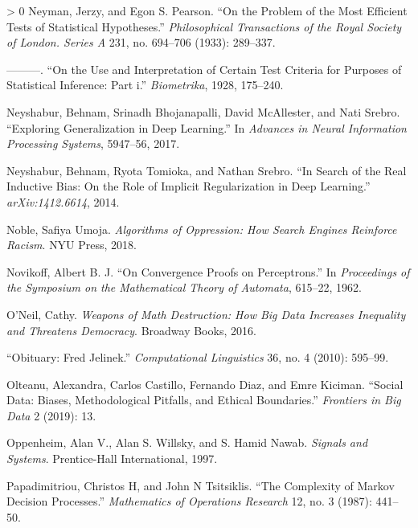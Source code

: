 \documentclass{tufte-book}
\newlength{\cslhangindent}
\newenvironment{CSLReferences}[3] %
 {%
  \setlength{\parindent}{0pt}
  \ifodd #1 \everypar{\setlength{\hangindent}{\cslhangindent}}\ignorespaces\fi
  \ifnum #2 > 0
  \setlength{\parskip}{#3\baselineskip}
  \fi
 }%
 {
 }
\begin{document}
\begin{CSLReferences}{1}{0}
\leavevmode\hypertarget{ref-neyman1933}{}%
Neyman, Jerzy, and Egon S. Pearson. {``On the Problem of the Most
Efficient Tests of Statistical Hypotheses.''} \emph{Philosophical
Transactions of the Royal Society of London. Series A} 231, no. 694--706
(1933): 289--337.

\leavevmode\hypertarget{ref-neyman1928use}{}%
---------. {``On the Use and Interpretation of Certain Test Criteria for
Purposes of Statistical Inference: Part i.''} \emph{Biometrika}, 1928,
175--240.

\leavevmode\hypertarget{ref-neyshabur2017exploring}{}%
Neyshabur, Behnam, Srinadh Bhojanapalli, David McAllester, and Nati
Srebro. {``Exploring Generalization in Deep Learning.''} In
\emph{Advances in Neural Information Processing Systems}, 5947--56,
2017.

\leavevmode\hypertarget{ref-neyshabur2014search}{}%
Neyshabur, Behnam, Ryota Tomioka, and Nathan Srebro. {``In Search of the
Real Inductive Bias: On the Role of Implicit Regularization in Deep
Learning.''} \emph{arXiv:1412.6614}, 2014.

\leavevmode\hypertarget{ref-noble2018algorithms}{}%
Noble, Safiya Umoja. \emph{Algorithms of Oppression: How Search Engines
Reinforce Racism}. {NYU} Press, 2018.

\leavevmode\hypertarget{ref-Novikoff1962}{}%
Novikoff, Albert B. J. {``On Convergence Proofs on Perceptrons.''} In
\emph{Proceedings of the Symposium on the Mathematical Theory of
Automata}, 615--22, 1962.

\leavevmode\hypertarget{ref-oneil2016weapons}{}%
O'Neil, Cathy. \emph{Weapons of Math Destruction: How Big Data Increases
Inequality and Threatens Democracy}. Broadway Books, 2016.

\leavevmode\hypertarget{ref-JelinekObit}{}%
{``Obituary: {F}red {J}elinek.''} \emph{Computational Linguistics} 36,
no. 4 (2010): 595--99.

\leavevmode\hypertarget{ref-olteanu2019social}{}%
Olteanu, Alexandra, Carlos Castillo, Fernando Diaz, and Emre Kiciman.
{``Social Data: Biases, Methodological Pitfalls, and Ethical
Boundaries.''} \emph{Frontiers in Big Data} 2 (2019): 13.

\leavevmode\hypertarget{ref-willsky1997signals}{}%
Oppenheim, Alan V., Alan S. Willsky, and S. Hamid Nawab. \emph{Signals
and Systems}. Prentice-Hall International, 1997.

\leavevmode\hypertarget{ref-papadimitriou1987complexity}{}%
Papadimitriou, Christos H, and John N Tsitsiklis. {``The Complexity of
{M}arkov {D}ecision {P}rocesses.''} \emph{Mathematics of Operations
Research} 12, no. 3 (1987): 441--50.


\end{CSLReferences}
\end{document}
